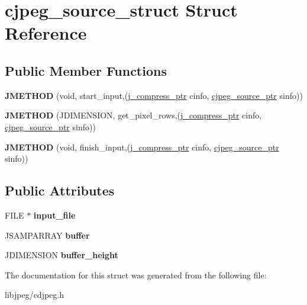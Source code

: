 \hypertarget{structcjpeg__source__struct}{\section{cjpeg\-\_\-source\-\_\-struct Struct Reference}
\label{structcjpeg__source__struct}
}
\subsection*{Public Member Functions}
\begin{DoxyCompactItemize}
\item 
\hypertarget{structcjpeg__source__struct_a0c0027418e48e9cd566807b4c7110aa1}{{\bfseries J\-M\-E\-T\-H\-O\-D} (void, start\-\_\-input,(\hyperlink{structjpeg__compress__struct}{j\-\_\-compress\-\_\-ptr} cinfo, \hyperlink{structcjpeg__source__struct}{cjpeg\-\_\-source\-\_\-ptr} sinfo))}\label{structcjpeg__source__struct_a0c0027418e48e9cd566807b4c7110aa1}

\item 
\hypertarget{structcjpeg__source__struct_adac53dc0fdf95208d2458921ebacb93e}{{\bfseries J\-M\-E\-T\-H\-O\-D} (J\-D\-I\-M\-E\-N\-S\-I\-O\-N, get\-\_\-pixel\-\_\-rows,(\hyperlink{structjpeg__compress__struct}{j\-\_\-compress\-\_\-ptr} cinfo, \hyperlink{structcjpeg__source__struct}{cjpeg\-\_\-source\-\_\-ptr} sinfo))}\label{structcjpeg__source__struct_adac53dc0fdf95208d2458921ebacb93e}

\item 
\hypertarget{structcjpeg__source__struct_a58d0834ab3f3ed64eba2251415744b71}{{\bfseries J\-M\-E\-T\-H\-O\-D} (void, finish\-\_\-input,(\hyperlink{structjpeg__compress__struct}{j\-\_\-compress\-\_\-ptr} cinfo, \hyperlink{structcjpeg__source__struct}{cjpeg\-\_\-source\-\_\-ptr} sinfo))}\label{structcjpeg__source__struct_a58d0834ab3f3ed64eba2251415744b71}

\end{DoxyCompactItemize}
\subsection*{Public Attributes}
\begin{DoxyCompactItemize}
\item 
\hypertarget{structcjpeg__source__struct_a88d55b02438c0a3ce21422aa8578679e}{F\-I\-L\-E $\ast$ {\bfseries input\-\_\-file}}\label{structcjpeg__source__struct_a88d55b02438c0a3ce21422aa8578679e}

\item 
\hypertarget{structcjpeg__source__struct_a2ffe2e6e6af7f434f712295d1760e001}{J\-S\-A\-M\-P\-A\-R\-R\-A\-Y {\bfseries buffer}}\label{structcjpeg__source__struct_a2ffe2e6e6af7f434f712295d1760e001}

\item 
\hypertarget{structcjpeg__source__struct_a01c25aca7ac8fed165b05139aeb1f762}{J\-D\-I\-M\-E\-N\-S\-I\-O\-N {\bfseries buffer\-\_\-height}}\label{structcjpeg__source__struct_a01c25aca7ac8fed165b05139aeb1f762}

\end{DoxyCompactItemize}


The documentation for this struct was generated from the following file\-:\begin{DoxyCompactItemize}
\item 
libjpeg/cdjpeg.\-h\end{DoxyCompactItemize}
